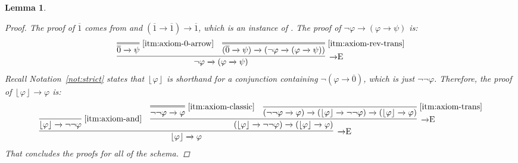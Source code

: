 \documentclass{amsart}
\newtheorem{lemma}[theorem]{Lemma}
\theoremstyle{definition}
\numberwithin{equation}{theorem}
\renewcommand{\phi}{\varphi}
\newcommand{\strict}[1]{{\left\lfloor#1\right\rfloor}}
\newcommand{\rat}[1]{{\overline{#1}}}
\newcommand{\narrow}[1]{\xrightarrow{#1}}
\renewcommand{\to}{\narrow{}}
\newcommand{\arr}{{\to}}
\newcommand{\elim}{\!\operatorname{E}}
\newcommand{\aref}[1]{\!\text{\ref{itm:axiom-#1}}}
\begin{document}
\begin{lemma}
\begin{proof}
    The proof of $\rat 1$ comes from \aref{id-arrow} and $(\rat 1\to\rat 1)\to\rat 1$, which is an instance of \aref{rationals}.
    The proof of $\neg\phi\to(\phi\to\psi)$ is:
    \[
      \infer[\arr\elim]{\neg\phi\to(\phi\to\psi)}{
        \infer=[\aref{0-arrow}]{\rat 0\to\psi}{} &
        \infer=[\aref{rev-trans}]{(\rat 0\to\psi)\to(\neg\phi\to(\phi\to\psi))}{}
      }
    \]
    Recall Notation~\ref{not:strict} states that $\strict\phi$ is shorthand for a conjunction containing $\neg(\phi\to\rat 0)$, which is just $\neg\neg\phi$. 
    Therefore, the proof of $\strict\phi\to\phi$ is:
    \[
      \infer[\arr\elim]{\strict\phi\to\phi}{
	      \infer[\aref{and}]{\strict\phi\to\neg\neg\phi}{} &
	      \infer[\arr\elim]{(\strict\phi\to\neg\neg\phi)\to(\strict\phi\to\phi)}{
	        \infer=[\aref{classic}]{\neg\neg\phi\to\phi\vphantom{\strict\phi}}{} &
	        \infer[\aref{trans}]{(\neg\neg\phi\to\phi)\to(\strict\phi\to\neg\neg\phi)\to(\strict\phi\to\phi)}{}
	      }
	    }
    \]
    That concludes the proofs for all of the schema.
  \end{proof}
\end{lemma}
\end{document}
